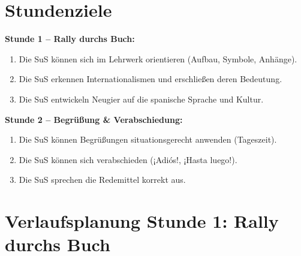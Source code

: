 \documentclass[11pt,a4paper]{article}
\begin{document}
\vspace{1em}

\section*{Stundenziele}

\textbf{Stunde 1 -- Rally durchs Buch:}
\begin{enumerate}[nosep]
    \item Die SuS können sich im Lehrwerk orientieren (Aufbau, Symbole, Anhänge).
    \item Die SuS erkennen Internationalismen und erschließen deren Bedeutung.
    \item Die SuS entwickeln Neugier auf die spanische Sprache und Kultur.
\end{enumerate}

\textbf{Stunde 2 -- Begrüßung \& Verabschiedung:}
\begin{enumerate}[nosep]
    \item Die SuS können Begrüßungen situationsgerecht anwenden (Tageszeit).
    \item Die SuS können sich verabschieden (¡Adiós!, ¡Hasta luego!).
    \item Die SuS sprechen die Redemittel korrekt aus.
\end{enumerate}

\newpage

\section*{Verlaufsplanung Stunde 1: Rally durchs Buch}
\end{document}
